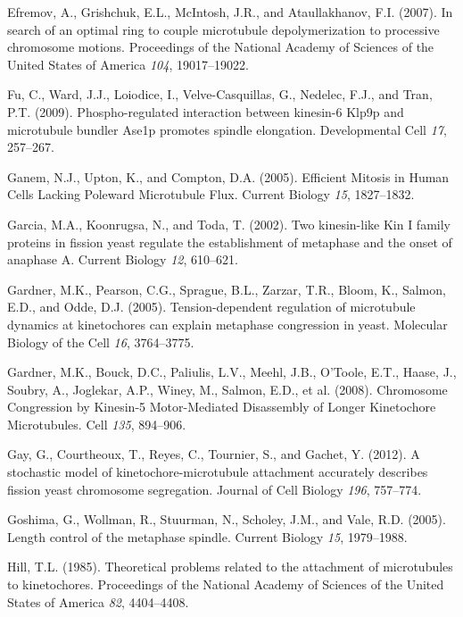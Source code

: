 \documentclass[12pt,a4paper,twoside,openright]{book}
\begin{document}
Efremov, A., Grishchuk, E.L., McIntosh, J.R., and Ataullakhanov, F.I.
(2007). In search of an optimal ring to couple microtubule
depolymerization to processive chromosome motions. Proceedings of the
National Academy of Sciences of the United States of America \emph{104},
19017--19022.

Fu, C., Ward, J.J., Loiodice, I., Velve-Casquillas, G., Nedelec, F.J.,
and Tran, P.T. (2009). Phospho-regulated interaction between kinesin-6
Klp9p and microtubule bundler Ase1p promotes spindle elongation.
Developmental Cell \emph{17}, 257--267.

Ganem, N.J., Upton, K., and Compton, D.A. (2005). Efficient Mitosis in
Human Cells Lacking Poleward Microtubule Flux. Current Biology
\emph{15}, 1827--1832.

Garcia, M.A., Koonrugsa, N., and Toda, T. (2002). Two kinesin-like Kin I
family proteins in fission yeast regulate the establishment of metaphase
and the onset of anaphase A. Current Biology \emph{12}, 610--621.

Gardner, M.K., Pearson, C.G., Sprague, B.L., Zarzar, T.R., Bloom, K.,
Salmon, E.D., and Odde, D.J. (2005). Tension-dependent regulation of
microtubule dynamics at kinetochores can explain metaphase congression
in yeast. Molecular Biology of the Cell \emph{16}, 3764--3775.

Gardner, M.K., Bouck, D.C., Paliulis, L.V., Meehl, J.B., O'Toole, E.T.,
Haase, J., Soubry, A., Joglekar, A.P., Winey, M., Salmon, E.D., et al.
(2008). Chromosome Congression by Kinesin-5 Motor-Mediated Disassembly
of Longer Kinetochore Microtubules. Cell \emph{135}, 894--906.

Gay, G., Courtheoux, T., Reyes, C., Tournier, S., and Gachet, Y. (2012).
A stochastic model of kinetochore-microtubule attachment accurately
describes fission yeast chromosome segregation. Journal of Cell Biology
\emph{196}, 757--774.

Goshima, G., Wollman, R., Stuurman, N., Scholey, J.M., and Vale, R.D.
(2005). Length control of the metaphase spindle. Current Biology
\emph{15}, 1979--1988.

Hill, T.L. (1985). Theoretical problems related to the attachment of
microtubules to kinetochores. Proceedings of the National Academy of
Sciences of the United States of America \emph{82}, 4404--4408.
\end{document}
